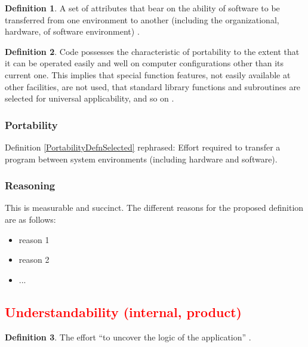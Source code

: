 \documentclass[letterpaper, cleveref]{lipics-v2019}
\newcommand{\authornote}[3]{\textcolor{#1}{[#3 ---#2]}}
\newcommand{\authornote}[3]{}
\newcommand{\jc}[1]{\authornote{red}{JC}{#1}} %
\newcommand{\notdone}[1]{\textcolor{red}{#1}}
\theoremstyle{definition}
\newtheorem{defn}{Definition}
\begin{document}
\begin{defn}
  A set of attributes that bear on the ability of software to be transferred
  from one environment to another (including the organizational, hardware, of
  software environment) \citep{pfleeger2006software}.
\end{defn}

\begin{defn}
  Code possesses the characteristic of portability to the extent that it can
  be operated easily and well on computer configurations other than its
  current one. This implies that special function features, not easily
  available at other facilities, are not used, that standard library
  functions and subroutines are selected for universal applicability, and so
  on \citep{boehm2007software}.
\end{defn}

\begin{mybox}
\subsubsection*{Portability}
Definition \ref{PortabilityDefnSelected} rephrased: Effort required to transfer
a program between system environments (including hardware and software).
\end{mybox}

\subsubsection*{Reasoning}

This is measurable and succinct.   The different reasons for the proposed
definition are as follows:

\begin{itemize}
  \item reason 1
  \item reason 2
  \item ...
\end{itemize}


\subsection{\notdone{Understandability (internal, product)}} %

\begin{defn}
  The effort ``to uncover the logic of the application''
  \citep{ghezzi1991fundamentals}.
\end{defn}
\end{document}
